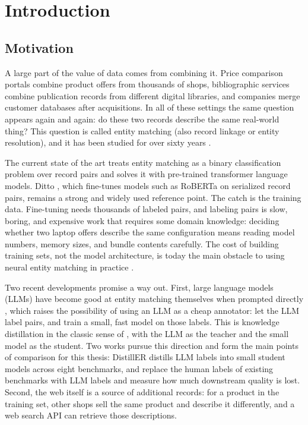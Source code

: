 \documentclass[a4paper,oneside,bibliography=totoc]{scrbook}
\begin{document}
\listoftables
\listoffigures

\mainmatter

\chapter{Introduction}
\label{ch:intro}

\section{Motivation}
\label{sec:motivation}

A large part of the value of data comes from combining it. Price comparison portals combine product offers from thousands of shops, bibliographic services combine publication records from different digital libraries, and companies merge customer databases after acquisitions. In all of these settings the same question appears again and again: do these two records describe the same real-world thing? This question is called entity matching (also record linkage or entity resolution), and it has been studied for over sixty years \cite{newcombe1959automatic,fellegi1969theory,christen2012data}.

The current state of the art treats entity matching as a binary classification problem over record pairs and solves it with pre-trained transformer language models. Ditto \cite{li2020deep}, which fine-tunes models such as RoBERTa \cite{liu2019roberta} on serialized record pairs, remains a strong and widely used reference point. The catch is the training data. Fine-tuning needs thousands of labeled pairs, and labeling pairs is slow, boring, and expensive work that requires some domain knowledge: deciding whether two laptop offers describe the same configuration means reading model numbers, memory sizes, and bundle contents carefully. The cost of building training sets, not the model architecture, is today the main obstacle to using neural entity matching in practice \cite{barlaug2021neural}.

Two recent developments promise a way out. First, large language models (LLMs) have become good at entity matching themselves when prompted directly \cite{narayan2022can,peeters2023using,peeters2025entity}, which raises the possibility of using an LLM as a cheap annotator: let the LLM label pairs, and train a small, fast model on those labels. This is knowledge distillation in the classic sense of \citet{hinton2015distilling}, with the LLM as the teacher and the small model as the student. Two works pursue this direction and form the main points of comparison for this thesis: DistillER \cite{zeakis2026distiller} distills LLM labels into small student models across eight benchmarks, and \citet{steiner2026labeling} replace the human labels of existing benchmarks with LLM labels and measure how much downstream quality is lost. Second, the web itself is a source of additional records: for a product in the training set, other shops sell the same product and describe it differently, and a web search API can retrieve those descriptions.
\end{document}
